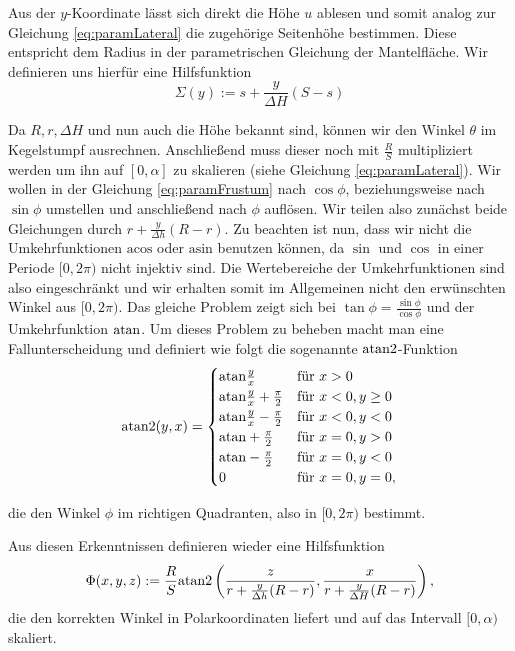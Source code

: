 Aus der $y$-Koordinate lässt sich direkt die Höhe $u$ ablesen und somit analog zur Gleichung \ref{eq:paramLateral} die zugehörige Seitenhöhe bestimmen. Diese entspricht dem Radius in der parametrischen Gleichung  der Mantelfläche.  Wir definieren uns hierfür eine Hilfsfunktion 
\begin{equation} \label{eq:help1}
	\Sigma(y) := s + \frac{y}{\Delta H} (S-s)
\end{equation}


Da $R, r, \Delta H$  und nun auch die Höhe bekannt sind, können wir den Winkel $\theta$ im Kegelstumpf ausrechnen. Anschließend muss dieser noch mit  $\frac{R}{S}$ multipliziert werden um ihn auf $[0, \alpha]$ zu skalieren (siehe Gleichung \ref{eq:paramLateral}).  Wir wollen in der Gleichung \ref{eq:paramFrustum} nach $\cos\phi$, beziehungsweise nach $\sin\phi$ umstellen und anschließend nach $\phi$ auflösen. Wir teilen also zunächst beide Gleichungen durch $r + \frac{y}{\Delta h} (R - r)$. Zu beachten ist nun, dass wir nicht die Umkehrfunktionen $\text{acos}$ oder $\text{asin}$ benutzen können, da $\sin$ und $\cos$ in einer Periode $[0, 2\pi)$ nicht injektiv sind. Die Wertebereiche der Umkehrfunktionen sind also eingeschränkt und wir erhalten somit im Allgemeinen nicht den erwünschten Winkel aus $[0, 2\pi)$. Das gleiche Problem zeigt sich bei $\tan\phi = \frac{\sin\phi}{\cos\phi}$ und der Umkehrfunktion $\text{atan}$. Um dieses Problem zu beheben macht man eine Fallunterscheidung und definiert wie folgt die sogenannte $\text{atan2}$-Funktion
\[
\text{atan2}(y,x) = 	\begin{cases}
					\text{atan} \frac{y}{x} 					& \mbox{für } x > 0 \\ 
					\text{atan} \frac{y}{x} + \frac{\pi}{2}	& \mbox{für } x < 0, y \geq 0 \\
					\text{atan} \frac{y}{x} - \frac{\pi}{2}	& \mbox{für } x < 0, y < 0 \\
					\text{atan} +\frac{\pi}{2}				& \mbox{für } x = 0, y > 0 \\
					\text{atan} -\frac{\pi}{2}				& \mbox{für } x = 0, y < 0 \\
					0									& \mbox{für } x = 0, y = 0,
				\end{cases}
\]

die den Winkel $\phi$ im richtigen Quadranten, also in $[0, 2\pi)$ bestimmt.

Aus diesen Erkenntnissen definieren wieder eine Hilfsfunktion
\begin{equation} \label{eq:help2}
\Phi(x,y,z) := \frac{R}{S} \text{atan2}\left(\frac{z}{r + \frac{y}{\Delta h} (R - r)}, \frac{x}{r + \frac{y}{\Delta H} (R - r)}\right), 
\end{equation}
die den korrekten Winkel in Polarkoordinaten liefert und auf das Intervall $[0, \alpha)$ skaliert. 

